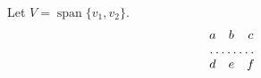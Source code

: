 \documentclass{article}
\renewcommand{\span}{\operatorname{span}}
\begin{document}
Let $V=\span\{v_1,v_2\}$.
\[\begin{matrix} a & b & c \\ \hdotsfor{3} \\ d & e & f \end{matrix}\]
\end{document}
